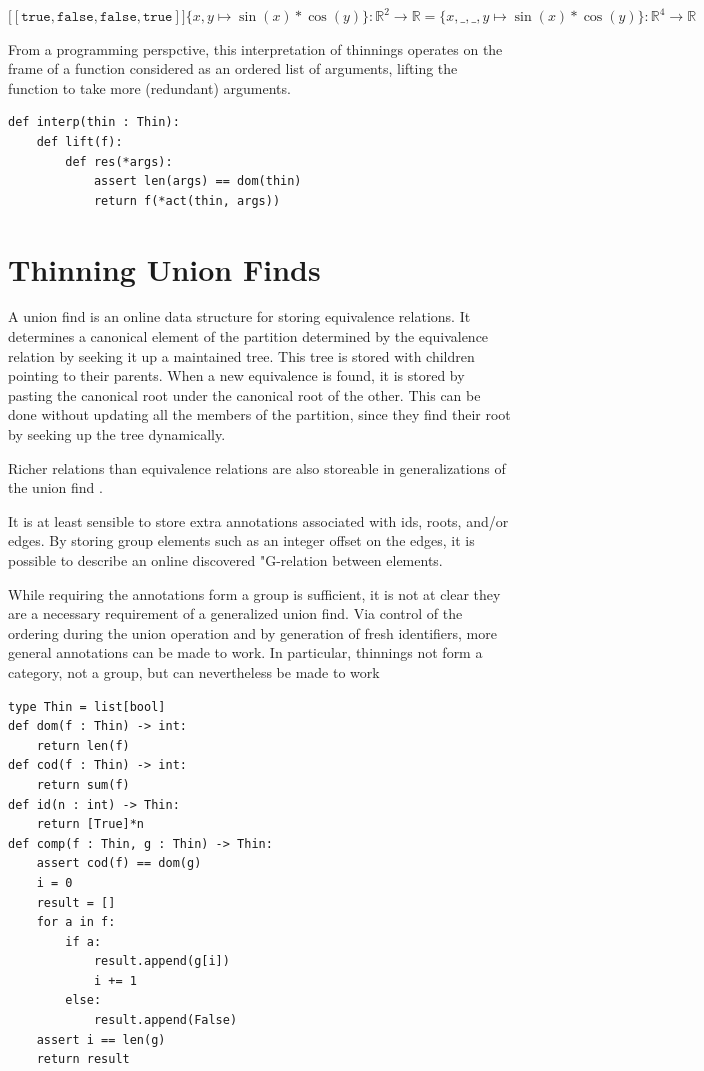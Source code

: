 \documentclass{article}%
\newcommand{\bR}{\mathbb{R}}
\newcommand{\true}{\ensuremath{\mathtt{true}}}
\newcommand{\false}{\ensuremath{\mathtt{false}}}
\begin{document}
$ \lbrack [\true, \false, \false, \true] \rbrack \{x,y \mapsto \sin(x) * \cos(y) \} : \mathbb{R}^2 \rightarrow \bR= \{x,\_,\_,y \mapsto \sin(x) * \cos(y) \} : \mathbb{R}^4 \rightarrow \mathbb{R} $

From a programming perspctive, this interpretation of thinnings operates on the frame of a function considered as an ordered list of arguments, lifting the function to take more (redundant) arguments.

\begin{lstlisting}
def interp(thin : Thin):
    def lift(f):
        def res(*args):
            assert len(args) == dom(thin)
            return f(*act(thin, args))
\end{lstlisting}

\section{Thinning Union Finds}
A union find is an online data structure for storing equivalence relations. It determines a canonical element of the partition determined by the equivalence relation by seeking it up a maintained tree. This tree is stored with children pointing to their parents. When a new equivalence is found, it is stored by pasting the canonical root under the canonical root of the other. This can be done without updating all the members of the partition, since they find their root by seeking up the tree dynamically.

Richer relations than equivalence relations are also storeable in generalizations of the union find \cite{groupuf}.

It is at least sensible to store extra annotations associated with ids, roots, and/or edges. By storing group elements such as an integer offset on the edges, it is possible to describe an online discovered "G-relation  between elements.

While requiring the annotations form a group is sufficient, it is not at clear they are a necessary requirement of a generalized union find. Via control of the ordering during the union operation and by generation of fresh identifiers, more general annotations can be made to work. In particular, thinnings not form a category, not a group, but can nevertheless be made to work

\begin{lstlisting}
type Thin = list[bool]
def dom(f : Thin) -> int:
    return len(f)
def cod(f : Thin) -> int:
    return sum(f)
def id(n : int) -> Thin:
    return [True]*n
def comp(f : Thin, g : Thin) -> Thin:
    assert cod(f) == dom(g)
    i = 0 
    result = []
    for a in f:
        if a:
            result.append(g[i])
            i += 1
        else:
            result.append(False)
    assert i == len(g)
    return result
\end{lstlisting}
\end{document}
